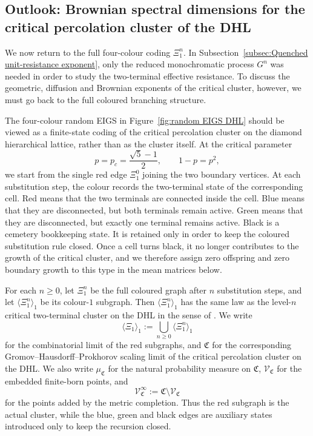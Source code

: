 \documentclass{article}
\theoremstyle{plain}
\theoremstyle{definition}
\begin{document}










\subsection{Outlook: Brownian spectral dimensions for the critical percolation cluster of the DHL}\label{subsec:dhl_cluster}

We now return to the full four-colour coding $\Xi_1^n$.
In Subsection~\ref{subsec:Quenched unit-resistance exponent}, only the reduced monochromatic process $G^n$ was needed in order to study the two-terminal effective resistance.
To discuss the geometric, diffusion and Brownian exponents of the critical cluster, however, we must go back to the full coloured branching structure.

The four-colour random EIGS in Figure~\ref{fig:random EIGS DHL} should be viewed as a finite-state coding of the critical percolation cluster on the diamond hierarchical lattice, rather than as the cluster itself.
At the critical parameter
\[
p=p_c=\frac{\sqrt5-1}{2},
\qquad
1-p=p^2,
\]
we start from the single red edge $\Xi_1^0$ joining the two boundary vertices.
At each substitution step, the colour records the two-terminal state of the corresponding cell.
Red means that the two terminals are connected inside the cell.
Blue means that they are disconnected, but both terminals remain active.
Green means that they are disconnected, but exactly one terminal remains active.
Black is a cemetery bookkeeping state.
It is retained only in order to keep the coloured substitution rule closed.
Once a cell turns black, it no longer contributes to the growth of the critical cluster, and we therefore assign zero offspring and zero boundary growth to this type in the mean matrices below.

For each $n\ge 0$, let $\Xi_1^n$ be the full coloured graph after $n$ substitution steps, and let $\langle \Xi_1^n\rangle_1$ be its colour-$1$ subgraph.
Then $\langle \Xi_1^n\rangle_1$ has the same law as the level-$n$ critical two-terminal cluster on the DHL in the sense of \cite{hambly2010diffusion}.
We write
\[
\langle \Xi_1\rangle_1:=\bigcup_{n\ge 0}\langle \Xi_1^n\rangle_1
\]
for the combinatorial limit of the red subgraphs, and $\mathfrak C$ for the corresponding Gromov--Hausdorff--Prokhorov scaling limit of the critical percolation cluster on the DHL.
We also write $\mu_{\mathfrak C}$ for the natural probability measure on $\mathfrak C$, $\mathscr V_{\mathfrak C}$ for the embedded finite-born points, and
\[
\mathscr V_{\mathfrak C}^{\infty}:=\mathfrak C\setminus \mathscr V_{\mathfrak C}
\]
for the points added by the metric completion.
Thus the red subgraph is the actual cluster, while the blue, green and black edges are auxiliary states introduced only to keep the recursion closed.
\end{document}
